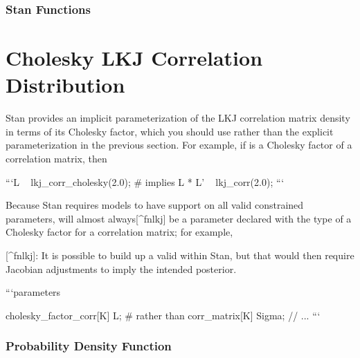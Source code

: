 \begin{description}


\subsubsection{Stan Functions}


\begin{description}    \end{description}


\begin{description}  \end{description}


\section{Cholesky LKJ Correlation Distribution}


Stan provides an implicit parameterization of the LKJ correlation matrix density in terms of its Cholesky factor, which you should use rather than the explicit parameterization in the previous section. For example, if  is a Cholesky factor of a correlation matrix, then


```\n L ~ lkj_corr_cholesky(2.0); # implies L * L' ~ lkj_corr(2.0); ```


Because Stan requires models to have support on all valid constrained parameters,  will almost always[^fnlkj] be a parameter declared with the type of a Cholesky factor for a correlation matrix; for example,

[^fnlkj]: It is possible to build up a valid  within Stan, but that would then require Jacobian adjustments to imply the intended posterior.

```\n parameters {   cholesky_factor_corr[K] L;   # rather than corr_matrix[K] Sigma;   // ... ```



\subsubsection{Probability Density Function}


}
\end{description}
